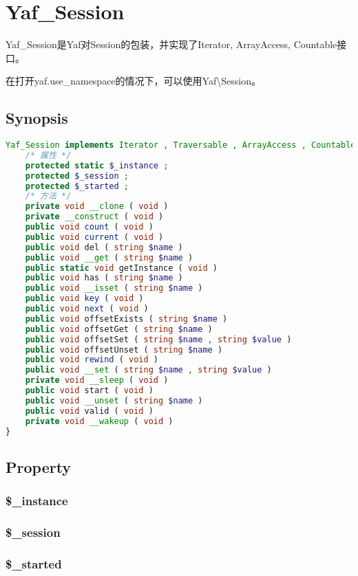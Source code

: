 \chapter{Yaf\_Session}

Yaf\_Session是Yaf对Session的包装，并实现了Iterator, ArrayAccess, Countable接口。

在打开yaf.use\_namespace的情况下，可以使用Yaf\textbackslash Session。


\section{Synopsis}


\begin{lstlisting}[language=PHP]
Yaf_Session implements Iterator , Traversable , ArrayAccess , Countable {
    /* 属性 */
    protected static $_instance ;
    protected $_session ;
    protected $_started ;
    /* 方法 */
    private void __clone ( void )
    private __construct ( void )
    public void count ( void )
    public void current ( void )
    public void del ( string $name )
    public void __get ( string $name )
    public static void getInstance ( void )
    public void has ( string $name )
    public void __isset ( string $name )
    public void key ( void )
    public void next ( void )
    public void offsetExists ( string $name )
    public void offsetGet ( string $name )
    public void offsetSet ( string $name , string $value )
    public void offsetUnset ( string $name )
    public void rewind ( void )
    public void __set ( string $name , string $value )
    private void __sleep ( void )
    public void start ( void )
    public void __unset ( string $name )
    public void valid ( void )
    private void __wakeup ( void )
}
\end{lstlisting}

\section{Property}


\subsection{\$\_instance}


\subsection{\$\_session}


\subsection{\$\_started}


